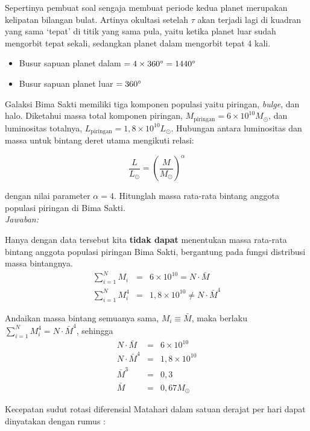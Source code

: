 \documentclass[11pt,fleqn]{exam}
\begin{document}
\begin{questions}
\begin{enumerate}[a)]
Sepertinya pembuat soal sengaja membuat periode kedua planet merupakan kelipatan bilangan bulat. Artinya okultasi setelah $\tau$ akan terjadi lagi di kuadran yang sama `tepat' di titik yang sama pula, yaitu ketika planet luar sudah mengorbit tepat sekali, sedangkan planet dalam mengorbit tepat 4 kali. 
\begin{itemize}
\item Busur sapuan planet dalam $= 4 \times 360\degree = 1440\degree$
\item Busur sapuan planet luar $= 360\degree$
\end{itemize}


\end{enumerate}


\vspace{0.3cm}
\question Galaksi Bima Sakti memiliki tiga komponen populasi yaitu piringan, \textit{bulge}, dan halo. Diketahui massa total komponen piringan, $M_{\text{piringan}}= 6\times 10^{10} M_{\odot}$, dan luminositas totalnya, $L_{\text{piringan}}= 1,8\times 10^{10} L_{\odot}$. Hubungan antara luminositas dan massa untuk bintang deret utama mengikuti relasi:

$$\frac{L}{L_{\odot}} = \left( \frac{M}{M_{\odot}}\right)^\alpha$$

dengan nilai parameter $\alpha=4$. Hitunglah massa rata-rata bintang anggota populasi piringan di Bima Sakti.\\


\textit{Jawaban: } 

Hanya dengan data tersebut kita \textbf{tidak dapat} menentukan massa rata-rata bintang anggota populasi piringan Bima Sakti, bergantung pada fungsi distribusi massa bintangnya.
\begin{eqnarray*}
\sum_{i=1}^{N} {M_i} &=& 6\times 10^{10} = N \cdot \bar{M} \\
\sum_{i=1}^{N} {M_i^4} &=& 1,8\times 10^{10} \neq N \cdot \bar{M}^4
\end{eqnarray*}

Andaikan massa bintang semuanya sama, $M_i \equiv \bar{M}$, maka berlaku $\sum_{i=1}^{N} {M_i^4} = N \cdot \bar{M}^4$, sehingga
\begin{eqnarray*}
N \cdot \bar{M} &=& 6\times 10^{10}\\
N \cdot \bar{M}^4 &=& 1,8\times 10^{10}\\
\bar{M}^3 &=& 0,3\\
\bar{M} &=& 0,67 M_{\odot}  
\end{eqnarray*}


\vspace{0.3cm}
\question Kecepatan sudut rotasi diferensial Matahari dalam satuan derajat per hari dapat dinyatakan dengan rumus :


\end{questions}
\end{document}
